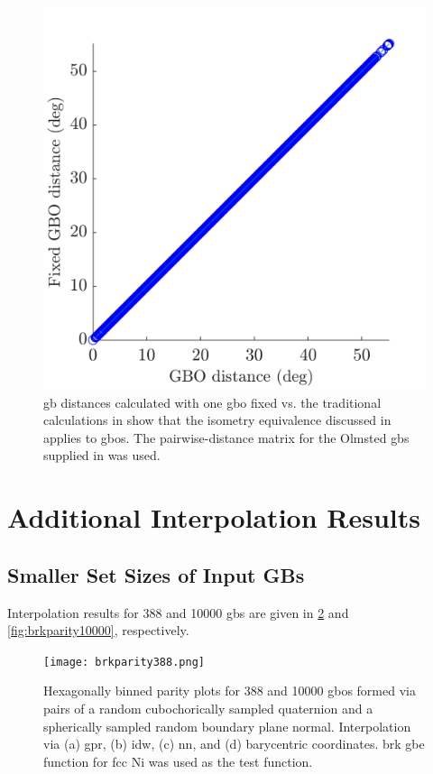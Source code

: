 \documentclass[preprint,12pt]{elsarticle}
\begin{document}
	\begin{figure}
		\centering
		\includegraphics{figures/pd-fix.png}
		\caption{\Gls{gb} distances calculated with one \gls{gbo} fixed vs. the traditional calculations in \citet{chesserLearningGrainBoundary2020} show that the isometry equivalence discussed in \citet{morawiecDistancesGrainInterfaces2019} applies to \glspl{gbo}. The pairwise-distance matrix for the Olmsted \glspl{gb} supplied in \cite{chesserGBOctonionCode2019} was used. }
		\label{fig:pd-fix}
	\end{figure}
	
	\section{Additional Interpolation Results}
	
	\subsection{Smaller Set Sizes of Input GBs}
	Interpolation results for \num{388} and \num{10000} \glspl{gb} are given in \cref{fig:brkparity388} and \cref{fig:brkparity10000}, respectively.
	
	\begin{figure}[!ht]
		\centering
		\texttt{[image: brkparity388.png]}
		\caption{Hexagonally binned parity plots for \num{388} \inpt{} and \num{10000} \outpt{} \glspl{gbo} formed via pairs of a random cubochorically sampled quaternion and a spherically sampled random boundary plane normal. Interpolation via (a) \gls{gpr}, (b) \gls{idw}, (c) \gls{nn}, and (d) barycentric coordinates.  \gls{brk} \gls{gbe} function for \gls{fcc} Ni \cite{bulatovGrainBoundaryEnergy2014} was used as the test function.}
		\label{fig:brkparity388}
	\end{figure}
	
\end{document}
